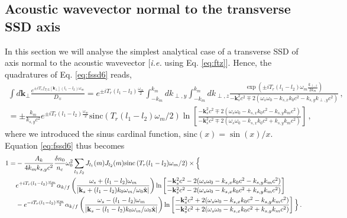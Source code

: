 \documentclass[
 reprint,
 amsmath,amssymb,
 aps,
]{revtex4-1}
\begin{document}
\begin{widetext}
\subsection{Acoustic wavevector normal to the transverse SSD axis}\label{sec:ssdtz}
In this section we will analyse the simplest analytical case of a transverse SSD of axis normal to the acoustic wavevector [\emph{i.e.} using Eq. \eqref{eq:ftz}]. 
Hence, the  quadratures of Eq. \eqref{eq:fssd6} reads, 
\begin{align}
 \int d\mathbf{k}_\perp 
     \frac{  e^{ \pm  iT_{r}f_{T/L}[\mathbf{k}_\perp]  (l_1-l_2) \omega_m }
     }{D_\mp}=  e^{\pm iT_{r} (l_1-l_2)\frac{ \omega_m}{2} }
      \int_{-k_m}^{k_m} dk_{\perp,y} \int_{-k_m}^{k_m} dk_{\perp,z}\frac{  \exp\left( \pm  iT_{r}  (l_1-l_2)\omega_m \frac{k_{\perp,z}}{2k_m}  \right)
     }{- \mathbf{k}_s^2c^2 \mp 2(\omega_s\omega_{0} - k_{s,x}   k_0 c^2 - k_{s,y} k_{\perp,y} c^2) }
   \, ,\label{eq:int1}  \nonumber \\
   =  \pm \frac{ k_m}{k_{s,y} c^2} e^{ \pm iT_{r} (l_1-l_2)\frac{ \omega_m}{2} }
      \mathrm{sinc}\left(  T_{r}  (l_1-l_2) \omega_m/2  \right)
    \ln\left[\frac{- \mathbf{k}_s^2c^2\mp 2(\omega_s\omega_{0} - k_{s,x}   k_0 c^2  - k_{s,y} k_m c^2)}
    {- \mathbf{k}_s^2c^2\mp 2(\omega_s\omega_{0} - k_{s,x}   k_0  c^2 + k_{s,y} k_m c^2)}\right]\, ,
\end{align}
where we introduced the sinus cardinal function, $ \mathrm{sinc}(x)=\sin(x)/x$.
Equation \eqref{eq:fssd6} thus becomes
 \begin{align}
   1 =& -\frac{A_k}{4k_mk_{s,y} c^2} \frac{\delta n_0}{n_c}\omega_0^2
    \sum_{l_1, l_2} 
     J_{l_1}(m)J_{l_2}(m)
      \mathrm{sinc}\left(  T_{r}  (l_1-l_2) \omega_m/2  \right)\times \Big\{
      \nonumber \\&
      e^{ + iT_{r} (l_1-l_2)\frac{ \omega_m}{2} }
  \alpha_{k/f}\left(\frac{\omega_s+(l_1-l_2)\omega_m}
  {\vert\mathbf{k}_s+(l_1-l_2)k_0\omega_m/\omega_0\Hat{\mathbf{x}} \vert}
  \right)   
  \ln\left[\frac{- \mathbf{k}_s^2c^2-2(\omega_s\omega_{0} - k_{s,x}   k_0 c^2  - k_{s,y} k_m c^2)}
    {- \mathbf{k}_s^2c^2 -2(\omega_s\omega_{0} - k_{s,x}   k_0 c^2  + k_{s,y} k_m c^2)}\right]
     \nonumber \\&
      -e^{ - iT_{r} (l_1-l_2)\frac{ \omega_m}{2} }
  \alpha_{k/f}\left(\frac{\omega_s-(l_1-l_2)\omega_m}
  {\vert\mathbf{k}_s-(l_1-l_2)k_0\omega_m/\omega_0\Hat{\mathbf{x}} \vert}
  \right)   
  \ln\left[\frac{- \mathbf{k}_s^2c^2+2(\omega_s\omega_{0} - k_{s,x}   k_0 c^2  - k_{s,y} k_m c^2)}
    {- \mathbf{k}_s^2c^2 +2(\omega_s\omega_{0} - k_{s,x}   k_0 c^2  + k_{s,y} k_m c^2)}\right]
    \Big\}
   \, .\label{eq:fssd7}
   \end{align}


\end{widetext}
\end{document}
